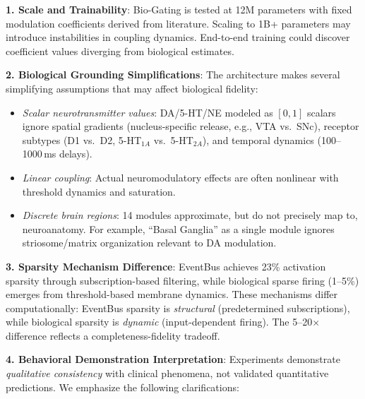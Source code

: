 \documentclass[preprint,12pt]{elsarticle}
\begin{document}
\textbf{1. Scale and Trainability}: Bio-Gating is tested at 12M parameters with fixed modulation coefficients derived from literature. Scaling to 1B+ parameters may introduce instabilities in coupling dynamics. End-to-end training could discover coefficient values diverging from biological estimates.

\textbf{2. Biological Grounding Simplifications}: The architecture makes several simplifying assumptions that may affect biological fidelity:
\begin{itemize}
\item \textit{Scalar neurotransmitter values}: DA/5-HT/NE modeled as $[0,1]$ scalars ignore spatial gradients (nucleus-specific release, e.g., VTA vs.\ SNc), receptor subtypes (D1 vs.\ D2, 5-HT$_{1A}$ vs.\ 5-HT$_{2A}$), and temporal dynamics (100--1000\,ms delays).
\item \textit{Linear coupling}: Actual neuromodulatory effects are often nonlinear with threshold dynamics and saturation.
\item \textit{Discrete brain regions}: 14 modules approximate, but do not precisely map to, neuroanatomy. For example, ``Basal Ganglia'' as a single module ignores striosome/matrix organization relevant to DA modulation.
\end{itemize}

\textbf{3. Sparsity Mechanism Difference}: EventBus achieves 23\% activation sparsity through subscription-based filtering, while biological sparse firing (1--5\%) emerges from threshold-based membrane dynamics. These mechanisms differ computationally: EventBus sparsity is \textit{structural} (predetermined subscriptions), while biological sparsity is \textit{dynamic} (input-dependent firing). The 5--20$\times$ difference reflects a completeness-fidelity tradeoff.

\textbf{4. Behavioral Demonstration Interpretation}: Experiments demonstrate \textit{qualitative consistency} with clinical phenomena, not validated quantitative predictions. We emphasize the following clarifications:
\end{document}
